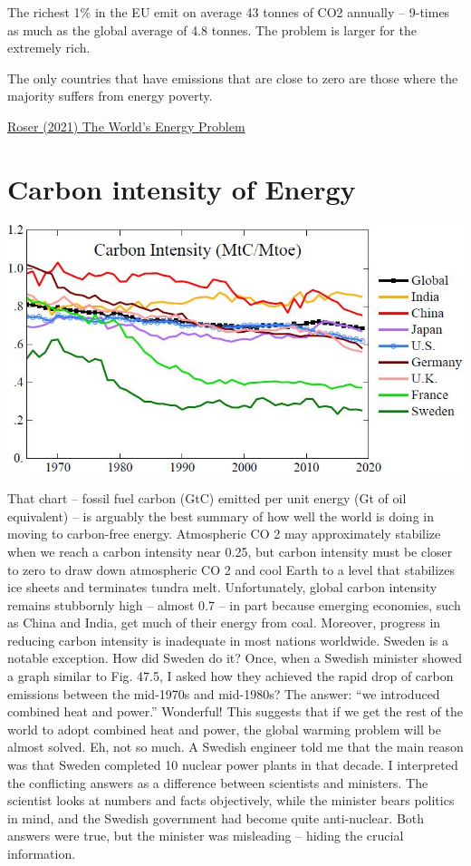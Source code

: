 \documentclass[
]{book}
\begin{document}
The richest 1\% in the EU emit on average 43 tonnes of CO2 annually -- 9-times as much as the global average of 4.8 tonnes.
The problem is larger for the extremely rich.

The only countries that have emissions that are close to zero are those where the majority suffers from energy poverty.

\href{https://ourworldindata.org/worlds-energy-problem}{Roser (2021) The World's Energy Problem}

\hypertarget{carbon-intensity-of-energy}{%
\chapter{Carbon intensity of Energy}\label{carbon-intensity-of-energy}}

\includegraphics{fig/carbon_intensity_James_Hansen_planetCh47.jpg}

That chart -- fossil fuel carbon (GtC) emitted per
unit energy (Gt of oil equivalent) -- is arguably the best summary of how well the world is doing
in moving to carbon-free energy. Atmospheric CO 2 may approximately stabilize when we reach
a carbon intensity near 0.25, but carbon intensity must be closer to zero to draw down
atmospheric CO 2 and cool Earth to a level that stabilizes ice sheets and terminates tundra melt.
Unfortunately, global carbon intensity remains stubbornly high -- almost 0.7 -- in part because
emerging economies, such as China and India, get much of their energy from coal. Moreover,
progress in reducing carbon intensity is inadequate in most nations worldwide.
Sweden is a notable exception. How did Sweden do it? Once, when a Swedish minister showed
a graph similar to Fig. 47.5, I asked how they achieved the rapid drop of carbon emissions
between the mid-1970s and mid-1980s? The answer: ``we introduced combined heat and
power.'' Wonderful! This suggests that if we get the rest of the world to adopt combined heat
and power, the global warming problem will be almost solved.
Eh, not so much. A Swedish engineer told me that the main reason was that Sweden completed
10 nuclear power plants in that decade. I interpreted the conflicting answers as a difference
between scientists and ministers. The scientist looks at numbers and facts objectively, while the
minister bears politics in mind, and the Swedish government had become quite anti-nuclear.
Both answers were true, but the minister was misleading -- hiding the crucial information.
\end{document}
